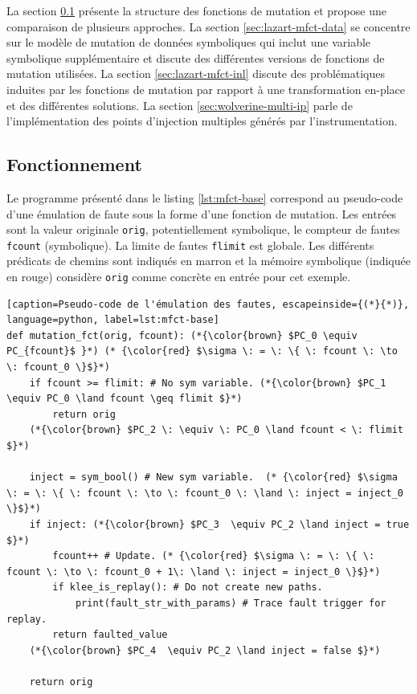         La section \ref{sec:lazart-mfct-base} présente la structure des fonctions de mutation et propose une comparaison de plusieurs approches.
        La section \ref{sec:lazart-mfct-data} se concentre sur le modèle de mutation de données symboliques qui inclut une variable symbolique supplémentaire et discute des différentes versions de fonctions de mutation utilisées.
        La section \ref{sec:lazart-mfct-inl} discute des problématiques induites par les fonctions de mutation par rapport à une transformation en-place et des différentes solutions.
        La section \ref{sec:wolverine-multi-ip} parle de l'implémentation des points d'injection multiples générés par l'instrumentation.
 
        \subsection{Fonctionnement}
        \label{sec:lazart-mfct-base}
            
                Le programme présenté dans le listing \ref{lst:mfct-base} correspond au pseudo-code d'une émulation de faute sous la forme d'une fonction de mutation. 
                Les entrées sont la valeur originale \texttt{orig}, potentiellement symbolique, le compteur de fautes \texttt{fcount} (symbolique). La limite de fautes \texttt{flimit} est globale. 
                Les différents prédicats de chemins sont indiqués en marron et la mémoire symbolique (indiquée en rouge) considère \texttt{orig} comme concrète en entrée pour cet exemple.
                
             \begin{center}
            \lstset{basicstyle=\large}
            \lstset{language=C,style=codeC}    
            \begin{lstlisting}[caption=Pseudo-code de l'émulation des fautes, escapeinside={(*}{*)}, language=python, label=lst:mfct-base]
def mutation_fct(orig, fcount): (*{\color{brown} $PC_0 \equiv PC_{fcount}$ }*) (* {\color{red} $\sigma \: = \: \{ \: fcount \: \to \: fcount_0 \}$}*)
    if fcount >= flimit: # No sym variable. (*{\color{brown} $PC_1  \equiv PC_0 \land fcount \geq flimit $}*)
        return orig      
    (*{\color{brown} $PC_2 \: \equiv \: PC_0 \land fcount < \: flimit $}*)
        
    inject = sym_bool() # New sym variable.  (* {\color{red} $\sigma \: = \: \{ \: fcount \: \to \: fcount_0 \: \land \: inject = inject_0 \}$}*)
    if inject: (*{\color{brown} $PC_3  \equiv PC_2 \land inject = true $}*)
        fcount++ # Update. (* {\color{red} $\sigma \: = \: \{ \: fcount \: \to \: fcount_0 + 1\: \land \: inject = inject_0 \}$}*)
        if klee_is_replay(): # Do not create new paths.
            print(fault_str_with_params) # Trace fault trigger for replay.
        return faulted_value
    (*{\color{brown} $PC_4  \equiv PC_2 \land inject = false $}*)

    return orig
                \end{lstlisting}    
            \end{center}     

